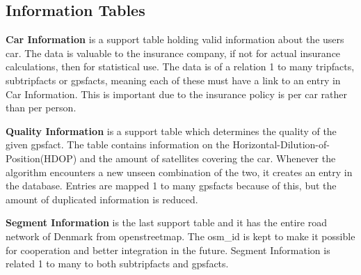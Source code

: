 \subsection{Information Tables}

\textbf{Car Information} is a support table holding valid information about the users car. The data is valuable to the insurance company, if not for actual insurance calculations, then for statistical use. The data is of a relation 1 to many tripfacts, subtripfacts or gpsfacts, meaning each of these must have a link to an entry in Car Information. This is important due to the insurance policy is per car rather than per person.

\textbf{Quality Information} is a support table which determines the quality of the given gpsfact. The table contains information on the Horizontal-Dilution-of-Position(HDOP) and the amount of satellites covering the car. Whenever the algorithm encounters a new unseen combination of the two, it creates an entry in the database. Entries are mapped 1 to many gpsfacts because of this, but  the amount of duplicated information is reduced.

\textbf{Segment Information} is the last support table and it has the entire road network of Denmark from openstreetmap. The osm\_id is kept to make it possible for cooperation and better integration in the future. Segment Information is related 1 to many to both subtripfacts and gpsfacts.
